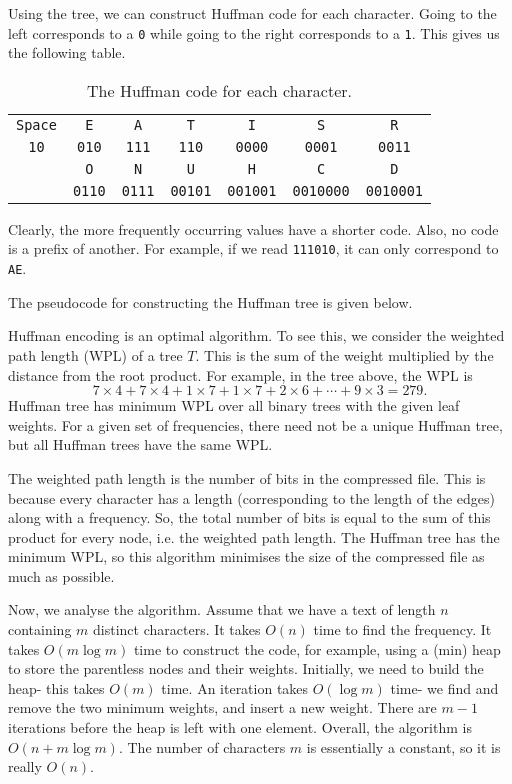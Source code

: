 \documentclass[a4paper, openany]{memoir}
\begin{document}
Using the tree, we can construct Huffman code for each character. Going to the left corresponds to a \texttt{0} while going to the right corresponds to a \texttt{1}. This gives us the following table.
\begin{table}[H]
    \centering
    \begin{tabular}{|ccccccc|}
        \hline
        \texttt{Space} & \texttt{E} & \texttt{A} & \texttt{T} & \texttt{I} & \texttt{S} & \texttt{R} \\
        \texttt{10} & \texttt{010} & \texttt{111} & \texttt{110} & \texttt{0000} & \texttt{0001} & \texttt{0011} \\
        \hline
        & \texttt{O} & \texttt{N} & \texttt{U} & \texttt{H} & \texttt{C} & \texttt{D} \\
        & \texttt{0110} & \texttt{0111} & \texttt{00101} & \texttt{001001} & \texttt{0010000} & \texttt{0010001} \\
        \hline
    \end{tabular}
    \caption{The Huffman code for each character.}
\end{table}
\noindent Clearly, the more frequently occurring values have a shorter code. Also, no code is a prefix of another. For example, if we read \texttt{111010}, it can only correspond to \texttt{AE}.

The pseudocode for constructing the Huffman tree is given below.


Huffman encoding is an optimal algorithm. To see this, we consider the weighted path length (WPL) of a tree $T$. This is the sum of the weight multiplied by the distance from the root product. For example, in the tree above, the WPL is
\[7 \times 4 + 7 \times 4 + 1 \times 7 + 1 \times 7 + 2 \times 6 + \cdots + 9 \times 3 = 279.\]
Huffman tree has minimum WPL over all binary trees with the given leaf weights. For a given set of frequencies, there need not be a unique Huffman tree, but all Huffman trees have the same WPL. 

The weighted path length is the number of bits in the compressed file. This is because every character has a length (corresponding to the length of the edges) along with a frequency. So, the total number of bits is equal to the sum of this product for every node, i.e. the weighted path length. The Huffman tree has the minimum WPL, so this algorithm minimises the size of the compressed file as much as possible.

Now, we analyse the algorithm. Assume that we have a text of length $n$ containing $m$ distinct characters. It takes $O(n)$ time to find the frequency. It takes $O(m \log m)$ time to construct the code, for example, using a (min) heap to store the parentless nodes and their weights. Initially, we need to build the heap- this takes $O(m)$ time. An iteration takes $O(\log m)$ time- we find and remove the two minimum weights, and insert a new weight. There are $m-1$ iterations before the heap is left with one element. Overall, the algorithm is $O(n + m \log m)$. The number of characters $m$ is essentially a constant, so it is really $O(n)$. 
\end{document}
